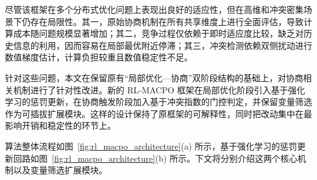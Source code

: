\documentclass[conference]{IEEEtran}
\begin{document}
尽管该框架在多个分布式优化问题上表现出良好的适应性，但在高维和冲突密集场景下仍存在局限性。其一，原始协商机制在所有共享维度上进行全面评估，导致计算成本随问题规模显著增加；其二，竞争过程仅依赖于即时适应度比较，缺乏对历史信息的利用，因而容易在局部最优附近停滞；其三，冲突检测依赖双侧扰动进行数值梯度估计，计算负担较重且数值稳定性不足。

针对这些问题，本文在保留原有“局部优化—协商”双阶段结构的基础上，对协商相关机制进行了针对性改进。新的 RL-MACPO 框架在局部优化阶段引入基于强化学习的惩罚更新，在协商触发阶段加入基于冲突指数的门控判定，并保留变量筛选作为可插拔扩展模块。这样的设计保持了原框架的可解释性，同时把改动集中在最影响开销和稳定性的环节上。

算法整体流程如图~\ref{fig:rl_macpo_architecture}(a) 所示，基于强化学习的惩罚更新回路如图~\ref{fig:rl_macpo_architecture}(b) 所示。下文将分别介绍这两个核心机制以及变量筛选扩展模块。
\end{document}
